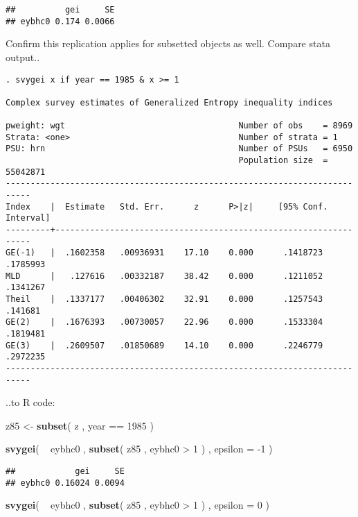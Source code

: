 \documentclass[]{book}
\newenvironment{Shaded}{\begin{snugshade}}{\end{snugshade}}
\newcommand{\KeywordTok}[1]{\textcolor[rgb]{0.13,0.29,0.53}{\textbf{{#1}}}}
\newcommand{\DataTypeTok}[1]{\textcolor[rgb]{0.13,0.29,0.53}{{#1}}}
\newcommand{\DecValTok}[1]{\textcolor[rgb]{0.00,0.00,0.81}{{#1}}}
\newcommand{\StringTok}[1]{\textcolor[rgb]{0.31,0.60,0.02}{{#1}}}
\newcommand{\NormalTok}[1]{{#1}}
\theoremstyle{definition}
\theoremstyle{definition}
\theoremstyle{remark}
\begin{document}
\begin{verbatim}
##          gei     SE
## eybhc0 0.174 0.0066
\end{verbatim}

Confirm this replication applies for subsetted objects as well. Compare
stata output..

\begin{verbatim}
. svygei x if year == 1985 & x >= 1

Complex survey estimates of Generalized Entropy inequality indices
 
pweight: wgt                                   Number of obs    = 8969
Strata: <one>                                  Number of strata = 1
PSU: hrn                                       Number of PSUs   = 6950
                                               Population size  = 55042871
---------------------------------------------------------------------------
Index    |  Estimate   Std. Err.      z      P>|z|     [95% Conf. Interval]
---------+-----------------------------------------------------------------
GE(-1)   |  .1602358   .00936931    17.10    0.000      .1418723   .1785993
MLD      |   .127616   .00332187    38.42    0.000      .1211052   .1341267
Theil    |  .1337177   .00406302    32.91    0.000      .1257543    .141681
GE(2)    |  .1676393   .00730057    22.96    0.000      .1533304   .1819481
GE(3)    |  .2609507   .01850689    14.10    0.000      .2246779   .2972235
---------------------------------------------------------------------------
\end{verbatim}

..to R code:

\begin{Shaded}
\begin{Highlighting}[]
\NormalTok{z85 <-}\StringTok{ }\KeywordTok{subset}\NormalTok{( z , year ==}\StringTok{ }\DecValTok{1985} \NormalTok{)}

\KeywordTok{svygei}\NormalTok{( ~}\StringTok{ }\NormalTok{eybhc0 , }\KeywordTok{subset}\NormalTok{( z85 , eybhc0 >}\StringTok{ }\DecValTok{1} \NormalTok{) , }\DataTypeTok{epsilon =} \NormalTok{-}\DecValTok{1} \NormalTok{)}
\end{Highlighting}
\end{Shaded}

\begin{verbatim}
##            gei     SE
## eybhc0 0.16024 0.0094
\end{verbatim}

\begin{Shaded}
\begin{Highlighting}[]
\KeywordTok{svygei}\NormalTok{( ~}\StringTok{ }\NormalTok{eybhc0 , }\KeywordTok{subset}\NormalTok{( z85 , eybhc0 >}\StringTok{ }\DecValTok{1} \NormalTok{) , }\DataTypeTok{epsilon =} \DecValTok{0} \NormalTok{)}
\end{Highlighting}
\end{Shaded}
\end{document}
